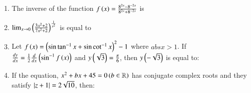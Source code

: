 \documentclass[journal,12pt,onecolumn]{IEEEtran}
\theoremstyle{remark}
\begin{document}
\begin{enumerate}
\item The inverse of the function $f\left(x\right)=\frac{8^{2x}-8^{-2x}}{8^{2x}+8^{-2x}}$ is
\begin{enumerate}
\end{enumerate}

\item $\lim_{x\to 0}\left(\frac{3x^2+2}{7x^2+2}\right)^{\frac{1}{x^2}}$ is equal to
\begin{enumerate}
\end{enumerate}

\item Let $f\left(x\right)=\left(\sin{\tan^{-1}x}+\sin{\cot^{-1}x}\right)^2-1$ where $abs{x}>1$. If\newline
$\frac{dy}{dx}=\frac{1}{2}\frac{d}{dx}\left(\sin^{-1}f\left(x\right)\right)$\newline
and $y\left(\sqrt{3}\right)=\frac{\pi}{6}$, then $y\left(-\sqrt{3}\right)$ is equal to:
\begin{enumerate}
\end{enumerate}

\item If the equation, $x^2+bx+45=0 \left(b\in\mathbb{R}\right)$ has conjugate complex roots and they satisfy $\left\vert z+1\right\vert=2\sqrt{10}$, then:
\begin{enumerate}
\end{enumerate}


\end{enumerate}
\end{document}
